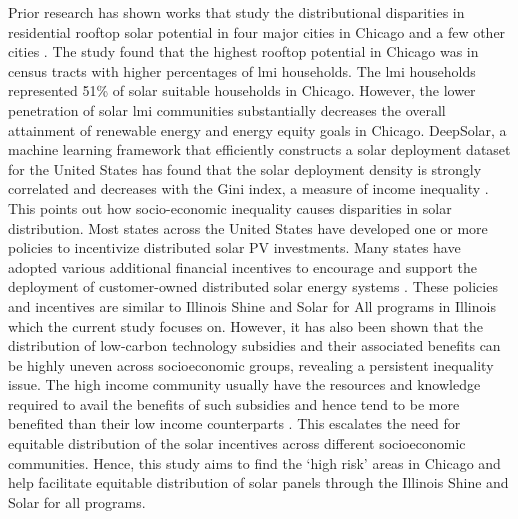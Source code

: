 Prior research has shown works that study the distributional disparities in residential rooftop solar potential in four major cities in Chicago and a few other cities \cite{reames_distributional_2020}. The study found that the highest rooftop potential in Chicago was in census tracts with higher percentages of \ac{lmi} households. The \ac{lmi} households represented 51\% of solar suitable households in Chicago. However, the lower penetration of solar \ac{lmi} communities substantially decreases the overall attainment of renewable energy and energy equity goals in Chicago.  DeepSolar, a machine learning framework that efficiently constructs a solar deployment dataset for the United States has found that the solar deployment density is strongly correlated and decreases with the Gini index, a measure of income inequality \cite{yu_deepsolar_2018}. This points out how socio-economic inequality causes disparities in solar distribution. Most states across the United States have developed one or more policies to incentivize distributed solar PV investments. Many states have adopted various additional financial incentives to encourage and support the deployment of customer-owned distributed solar energy systems \cite{pitt_assessing_2015}. These policies and incentives are similar to Illinois Shine and Solar for All programs in Illinois which the current study focuses on.
However, it has also been shown that the distribution of low-carbon technology subsidies and their associated benefits can be highly uneven across socioeconomic groups, revealing a persistent inequality issue. The high income community usually have the resources and knowledge required to avail the benefits of such subsidies and hence tend to be more benefited than their low income counterparts \cite{stewart_all_2021}. This escalates the need for equitable distribution of the solar incentives across different socioeconomic communities. Hence, this study aims to find the ‘high risk’ areas in Chicago and help facilitate equitable distribution of solar panels through the Illinois Shine and Solar for all programs.
